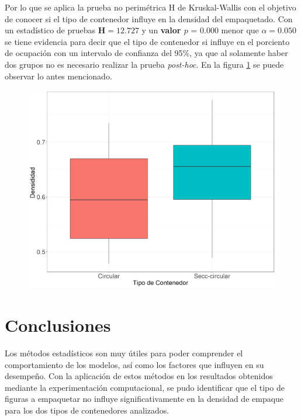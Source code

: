 \documentclass[5p,times]{elsarticle}
\begin{document}
Por lo que se aplica la prueba no perimétrica H de Kruskal-Wallis con el objetivo de conocer si el tipo de contenedor influye en la densidad del empaquetado. Con un estadístico de pruebas $\textbf{H}=12.727$	 y un \textbf{valor $p$} = 0.000 menor que $\alpha = 0.050$ se tiene evidencia para decir que el tipo de contenedor si influye en el porciento de ocupación con un intervalo de confianza del 95\%, ya que al solamente haber dos grupos no es necesario realizar la prueba \textit{post-hoc}. En la figura \ref{fig:boxplotcG}  se puede observar lo antes mencionado.   
	\begin{figure}
				\begin{center}
					\includegraphics[scale=0.35]{figuras/Gboxplot.png}
					\label{fig:boxplotcG}
				\end{center}
			\end{figure}
 
\section{Conclusiones} \label{Section7}
	
Los métodos estadísticos son muy útiles para poder comprender el comportamiento de los modelos, así como los factores que influyen en su desempeño. Con la aplicación de estos métodos en los resultados obtenidos mediante la experimentación computacional, se pudo identificar que el tipo de figuras a empaquetar no influye significativamente en la densidad de empaque para los dos tipos de contenedores analizados.
\end{document}
